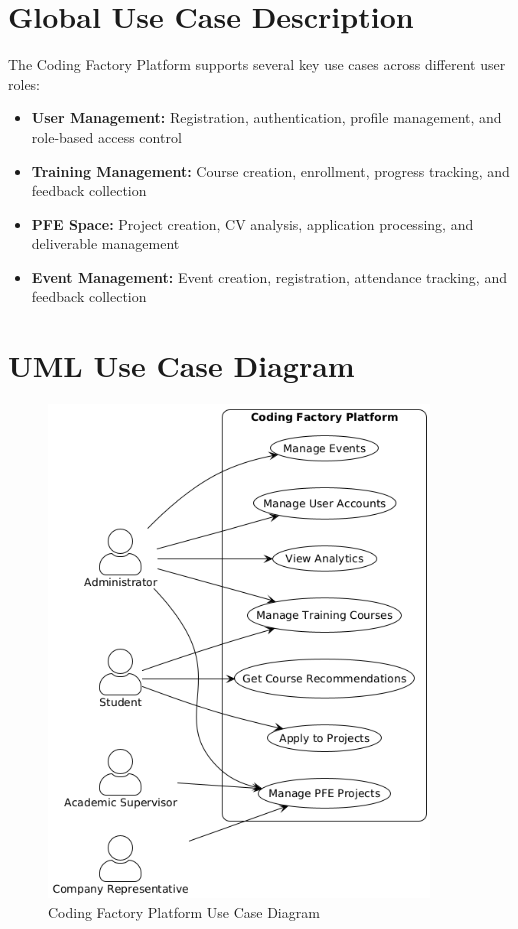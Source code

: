 \documentclass[12pt,a4paper]{report}
\begin{document}
\section{Global Use Case Description}

The Coding Factory Platform supports several key use cases across different user roles:

\begin{itemize}
    \item \textbf{User Management:} Registration, authentication, profile management, and role-based access control
    \item \textbf{Training Management:} Course creation, enrollment, progress tracking, and feedback collection
    \item \textbf{PFE Space:} Project creation, CV analysis, application processing, and deliverable management
    \item \textbf{Event Management:} Event creation, registration, attendance tracking, and feedback collection
\end{itemize}

\section{UML Use Case Diagram}

\begin{figure}[!htbp]
\centering
\includegraphics[width=0.9\textwidth]{media/usecase.png}
\caption{Coding Factory Platform Use Case Diagram}
\label{fig:use-case-diagram}
\end{figure}
\end{document}
